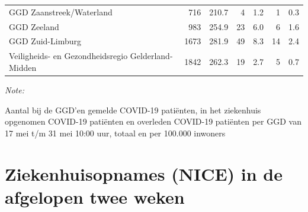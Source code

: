\documentclass[
  english,
  man,floatsintext]{apa6}
\begin{document}
\begin{table}
\begin{threeparttable}
\begin{tabular}{lrrrrrr}
GGD Zaanstreek/Waterland & 716 & 210.7 & 4 & 1.2 & 1 & 0.3\\
GGD Zeeland & 983 & 254.9 & 23 & 6.0 & 6 & 1.6\\
GGD Zuid-Limburg & 1673 & 281.9 & 49 & 8.3 & 14 & 2.4\\
Veiligheids- en Gezondheidsregio Gelderland-Midden & 1842 & 262.3 & 19 & 2.7 & 5 & 0.7\\
\bottomrule
\end{tabular}
\begin{tablenotes}
\item \textit{Note: } 
\item Aantal bij de GGD’en gemelde COVID-19 patiënten, in het ziekenhuis opgenomen COVID-19 patiënten en overleden COVID-19 patiënten per GGD van 17 mei t/m 31 mei 10:00 uur, totaal en per 100.000 inwoners
\end{tablenotes}
\end{threeparttable}
\endgroup{}
\end{table}

\newpage

\hypertarget{ziekenhuisopnames-nice-in-de-afgelopen-twee-weken}{%
\section{Ziekenhuisopnames (NICE) in de afgelopen twee weken}\label{ziekenhuisopnames-nice-in-de-afgelopen-twee-weken}}
\end{document}

